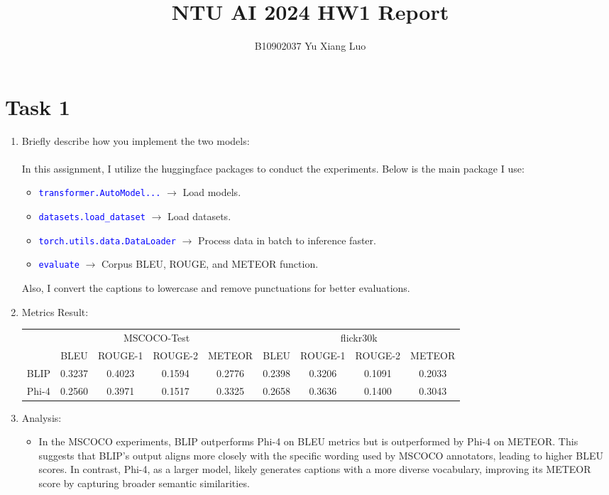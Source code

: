 \documentclass{article}
\title{NTU AI 2024 HW1 Report}
\author{B10902037 Yu Xiang Luo}
\date{}
\begin{document}
\maketitle

\section*{Task 1}

\begin{enumerate}
    \item Briefly describe how you implement the two models: \\
		\\
		In this assignment, I utilize the huggingface packages to conduct the experiments. Below is the main package I use:
        \begin{itemize}
            \item \textcolor{blue}{\texttt{transformer.AutoModel...}} $\rightarrow$ Load models.
            \item \textcolor{blue}{\texttt{datasets.load\_dataset}} $\rightarrow$ Load datasets.
            \item \textcolor{blue}{\texttt{torch.utils.data.DataLoader}} $\rightarrow$ Process data in batch to inference faster.
			\item \textcolor{blue}{\texttt{evaluate}} $\rightarrow$ Corpus BLEU, ROUGE, and METEOR function.
        \end{itemize}
		Also, I convert the captions to lowercase and remove punctuations for better evaluations.
    \item Metrics Result:
        \begin{table}[ht]
        \centering
        \begin{tabular}{l cccc cccc}
        \toprule
         & \multicolumn{4}{c}{MSCOCO-Test} & \multicolumn{4}{c}{flickr30k}\\
        \cmidrule(lr){2-5} \cmidrule(lr){6-9}
         & BLEU & ROUGE-1 & ROUGE-2 & METEOR & BLEU & ROUGE-1 & ROUGE-2 & METEOR \\
        \midrule
        BLIP  & 0.3237 & 0.4023 & 0.1594 & 0.2776 & 0.2398 & 0.3206 & 0.1091 & 0.2033 \\
        Phi-4 & 0.2560 & 0.3971 & 0.1517 & 0.3325 & 0.2658 & 0.3636 & 0.1400 & 0.3043 \\
        \bottomrule
        \end{tabular}
        \end{table}
	\item Analysis:
	\begin{itemize}
		\item In the MSCOCO experiments, BLIP outperforms Phi-4 on BLEU metrics but is outperformed by Phi-4 on METEOR. This suggests that BLIP's output aligns more closely with the specific wording used by MSCOCO annotators, leading to higher BLEU scores. In contrast, Phi-4, as a larger model, likely generates captions with a more diverse vocabulary, improving its METEOR score by capturing broader semantic similarities.
		

\end{itemize}
\end{enumerate}
\end{document}
